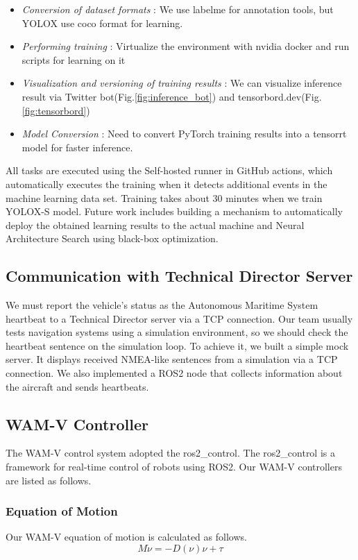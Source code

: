 \documentclass[lettersize,journal]{IEEEtran}
\begin{document}
\begin{itemize}
    \item {\it Conversion of dataset formats }:
        We use labelme for annotation tools, but YOLOX use coco format for learning.
    \item {\it Performing training }:
        Virtualize the environment with nvidia docker and run scripts for learning on it
    \item {\it Visualization and versioning of training results }:
        We can visualize inference result via Twitter bot(Fig.\ref{fig:inference_bot}) and tensorbord.dev(Fig.\ref{fig:tensorbord})
    \item {\it Model Conversion }:
        Need to convert PyTorch training results into a tensorrt model for faster inference.
\end{itemize}

All tasks are executed using the Self-hosted runner in GitHub actions, 
which automatically executes the training when it detects additional events in the machine learning data set.
Training takes about 30 minutes when we train YOLOX-S model.
Future work includes building a mechanism to automatically deploy the obtained learning results to 
the actual machine and Neural Architecture Search using black-box optimization.

\subsection{Communication with Technical Director Server}
We must report the vehicle's status as the Autonomous Maritime System heartbeat to a Technical Director server via a TCP connection. 
Our team usually tests navigation systems using a simulation environment, 
so we should check the heartbeat sentence on the simulation loop. 
To achieve it, we built a simple mock server\cite{robotx_communication}.
It displays received NMEA-like sentences from a simulation via a TCP connection.
We also implemented a ROS2 node that collects information about the aircraft and sends heartbeats.

\subsection{WAM-V Controller}
The WAM-V control system adopted the ros2\_control\cite{ros2_control,wamv_control}.
The ros2\_control is a framework for real-time control of robots using ROS2.
Our WAM-V controllers are listed as follows.
\subsubsection{Equation of Motion}
Our WAM-V equation of motion is calculated as follows.
\begin{equation}
  M \dot\nu = -D(\nu)\nu + \tau
\end{equation}
\end{document}
